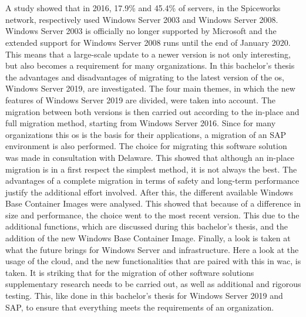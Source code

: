 \chapter*{}
A study showed that in 2016, 17.9\% and 45.4\% of servers, in the Spiceworks network, respectively used Windows Server 2003 and Windows Server 2008.\autocite{Tsai2016} 
Windows Server 2003 is officially no longer supported by Microsoft and the extended support for Windows Server 2008 runs until the end of January 2020. 
This means that a large-scale update to a newer version is not only interesting, but also becomes a requirement for many organizations. 
In this bachelor's thesis the advantages and disadvantages of migrating to the latest version of the \acrshort{os}, Windows Server 2019, are investigated. 
The four main themes, in which the new features of Windows Server 2019 are divided, were taken into account. 
The migration between both versions is then carried out according to the in-place and full migration method, starting from Windows Server 2016. 
Since for many organizations this \acrshort{os} is the basis for their applications, a migration of an SAP environment is also performed. 
The choice for migrating this software solution was made in consultation with Delaware. 
This showed that although an in-place migration is in a first respect the simplest method, it is not always the best. 
The advantages of a complete migration in terms of safety and long-term performance justify the additional effort involved.
After this, the different available Windows Base Container Images were analysed. 
This showed that because of a difference in size and performance, the choice went to the most recent version. 
This due to the additional functions, which are discussed during this bachelor's thesis, and the addition of the new Windows Base Container Image.
Finally, a look is taken at what the future brings for Windows Server and infrastructure. 
Here a look at the usage of the cloud, and the new functionalities that are paired with this in \acrlong{wac}, is taken. 
It is striking that for the migration of other software solutions supplementary research needs to be carried out, as well as additional and rigorous testing. 
This, like done in this bachelor's thesis for Windows Server 2019 and SAP, to ensure that everything meets the requirements of an organization.